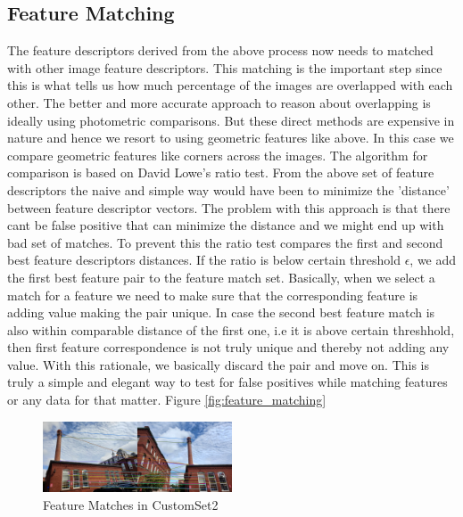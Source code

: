 \documentclass[conference]{IEEEtran}
\begin{document}
\subsection{Feature Matching}
The feature descriptors derived from the above process now needs to matched with other image feature descriptors. This matching is the important step since this is what tells us how much percentage of the images are overlapped with each other. The better and more accurate approach to reason about overlapping is ideally using photometric comparisons. But these direct methods are expensive in nature and hence we resort to using geometric features like above. In this case we compare geometric features like corners across the images. The algorithm for comparison is based on David Lowe's ratio test. From the above set of feature descriptors the naive and simple way would have been to minimize the 'distance' between feature descriptor vectors. The problem with this approach is that there cant be false positive that can minimize the distance and we might end up with bad set of matches. To prevent this the ratio test compares the first and second best feature descriptors distances. If the ratio is below certain threshold $\epsilon$, we add the first best feature pair to the feature match set. Basically, when we select a match for a feature we need to make sure that the corresponding feature is adding value making the pair unique. In case the second best feature match is also within comparable distance of the first one, i.e it is above certain threshhold, then first feature correspondence is not truly unique and thereby not adding any value. With this rationale, we basically discard the pair and move on. This is truly a simple and elegant way to test for false positives while matching features or any data for that matter. Figure \ref{fig:feature_matching}

\begin{figure}[h]
  \centering
  \captionsetup{justification=centering}
  \includegraphics[width=0.5\textwidth]{phase1/customset2_feature_matches_2_1.png}
  \caption{\label{fig:ransac_feature_matching}Feature Matches in CustomSet2}
\end{figure}
\end{document}
